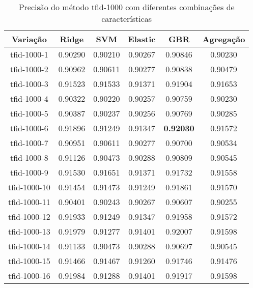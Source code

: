 \begin{table}[H]
\label{tab:precisiontfid1000}
\centering
\begin{tabular}{|c| c c  c  c  c| }
\hline
Variação &  Ridge & SVM & Elastic & GBR & Agregação  \\ 
\hline
tfid-1000-1 & 0.90290 & 0.90210 & 0.90267 & 0.90846 & 0.90230 \\
\hline
tfid-1000-2 & 0.90962 & 0.90611 & 0.90277 & 0.90838 & 0.90479 \\
\hline
tfid-1000-3 & 0.91523 & 0.91533 & 0.91371 & 0.91904 & 0.91653 \\
\hline
tfid-1000-4 & 0.90322 & 0.90220 & 0.90257 & 0.90759 & 0.90230 \\
\hline
tfid-1000-5 & 0.90387 & 0.90237 & 0.90256 & 0.90769 & 0.90285 \\
\hline
tfid-1000-6 & 0.91896 & 0.91249 & 0.91347 & \textbf{0.92030} & 0.91572 \\
\hline
tfid-1000-7 & 0.90951 & 0.90611 & 0.90277 & 0.90700 & 0.90534 \\
\hline
tfid-1000-8 & 0.91126 & 0.90473 & 0.90288 & 0.90809 & 0.90545 \\
\hline
tfid-1000-9 & 0.91530 & 0.91651 & 0.91371 & 0.91732 & 0.91558 \\
\hline
tfid-1000-10 & 0.91454 & 0.91473 & 0.91249 & 0.91861 & 0.91570 \\
\hline
tfid-1000-11 & 0.90401 & 0.90243 & 0.90267 & 0.90607 & 0.90255 \\
\hline
tfid-1000-12 & 0.91933 & 0.91249 & 0.91347 & 0.91958 & 0.91572 \\
\hline
tfid-1000-13 & 0.91979 & 0.91277 & 0.91401 & 0.92007 & 0.91598 \\
\hline
tfid-1000-14 & 0.91133 & 0.90473 & 0.90288 & 0.90697 & 0.90545 \\
\hline
tfid-1000-15 & 0.91466 & 0.91467 & 0.91260 & 0.91746 & 0.91476 \\
\hline
tfid-1000-16 & 0.91984 & 0.91288 & 0.91401 & 0.91917 & 0.91598 \\
\hline
\end{tabular}
\caption{Precisão do método tfid-1000 com diferentes combinações de características}
\end{table}

